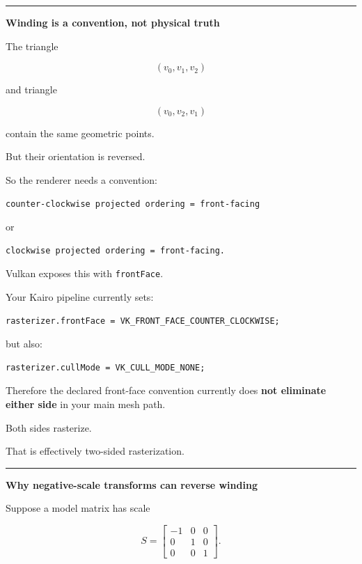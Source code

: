 \begin{center}\rule{0.5\linewidth}{0.5pt}\end{center}

\textbf{Winding is a convention, not physical truth}

The triangle

\[
(v_0,v_1,v_2)
\]

and triangle

\[
(v_0,v_2,v_1)
\]

contain the same geometric points.

But their orientation is reversed.

So the renderer needs a convention:

\begin{verbatim}
counter-clockwise projected ordering = front-facing
\end{verbatim}

or

\begin{verbatim}
clockwise projected ordering = front-facing.
\end{verbatim}

Vulkan exposes this with \texttt{frontFace}.

Your Kairo pipeline currently sets:

\begin{verbatim}
rasterizer.frontFace = VK_FRONT_FACE_COUNTER_CLOCKWISE;
\end{verbatim}

but also:

\begin{verbatim}
rasterizer.cullMode = VK_CULL_MODE_NONE;
\end{verbatim}

Therefore the declared front-face convention currently does \textbf{not eliminate either side} in your main mesh path.

Both sides rasterize.

That is effectively two-sided rasterization.

\begin{center}\rule{0.5\linewidth}{0.5pt}\end{center}

\textbf{Why negative-scale transforms can reverse winding}

Suppose a model matrix has scale

\[
S=
\begin{bmatrix}
-1&0&0\\
0&1&0\\
0&0&1
\end{bmatrix}.
\]

